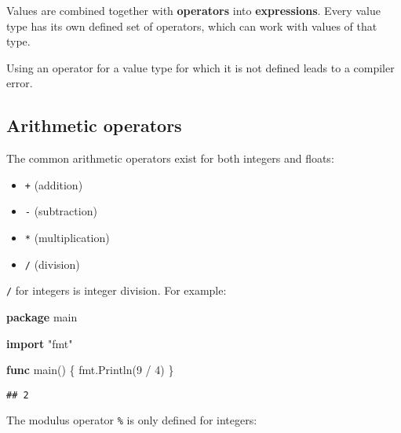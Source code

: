 \documentclass[]{book}
\newenvironment{Shaded}{\begin{snugshade}}{\end{snugshade}}
\newcommand{\DecValTok}[1]{\textcolor[rgb]{0.00,0.00,0.81}{#1}}
\newcommand{\KeywordTok}[1]{\textcolor[rgb]{0.13,0.29,0.53}{\textbf{#1}}}
\newcommand{\NormalTok}[1]{#1}
\newcommand{\StringTok}[1]{\textcolor[rgb]{0.31,0.60,0.02}{#1}}
\providecommand{\tightlist}{%
  \setlength{\itemsep}{0pt}\setlength{\parskip}{0pt}}
\let\BeginKnitrBlock\begin \let\EndKnitrBlock\end
\begin{document}
Values are combined together with \textbf{operators} into \textbf{expressions}. Every
value type has its own defined set of operators, which can work with values of
that type.

\BeginKnitrBlock{rmdnote}
Using an operator for a value type for which it is not defined leads to a
compiler error.
\EndKnitrBlock{rmdnote}

\hypertarget{arithmetic-operators}{%
\subsection{Arithmetic operators}\label{arithmetic-operators}}

The common arithmetic operators exist for both integers and floats:

\begin{itemize}
\tightlist
\item
  \texttt{+} (addition)
\item
  \texttt{-} (subtraction)
\item
  \texttt{*} (multiplication)
\item
  \texttt{/} (division)
\end{itemize}

\texttt{/} for integers is integer division. For example:

\begin{Shaded}
\begin{Highlighting}[]
\KeywordTok{package}\NormalTok{ main}

\KeywordTok{import} \StringTok{"fmt"}

\KeywordTok{func}\NormalTok{ main() \{}
\NormalTok{    fmt.Println(}\DecValTok{9}\NormalTok{ / }\DecValTok{4}\NormalTok{)}
\NormalTok{\}}
\end{Highlighting}
\end{Shaded}

\begin{verbatim}
## 2
\end{verbatim}

The modulus operator \texttt{\%} is only defined for integers:

\begin{Shaded}
\end{Shaded}
\end{document}
